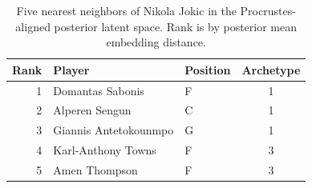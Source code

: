\begin{table}[htbp]
  \centering\small
  \begin{tabular}{rllc}
    \toprule
    Rank & Player & Position & Archetype \\
    \midrule
    1 & Domantas Sabonis & F & 1 \\
    2 & Alperen Sengun & C & 1 \\
    3 & Giannis Antetokounmpo & G & 1 \\
    4 & Karl-Anthony Towns & F & 3 \\
    5 & Amen Thompson & F & 3 \\
    \bottomrule
  \end{tabular}
  \caption{Five nearest neighbors of Nikola Jokic in the Procrustes-aligned posterior latent space. Rank is by posterior mean embedding distance.}
  \label{tab:Nikola_Jokic_neighbors}
\end{table}

